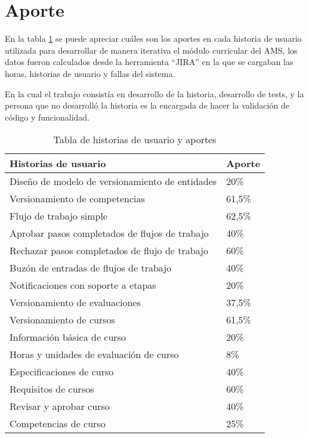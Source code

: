 \section{Aporte}
En la tabla \ref{mis-aportes} se puede apreciar cuáles son los aportes en cada historia de usuario utilizada para desarrollar de manera iterativa el módulo curricular del AMS, los datos fueron calculados desde la herramienta \enquote{JIRA} en la que se cargaban las horas, historias de usuario y fallas del sistema.

En la cual el trabajo consistía en desarrollo de la historia, desarrollo de tests, y la persona que no desarrolló la historia es la encargada de hacer la validación de código y funcionalidad.

\begin{table}[H]
\centering
\caption{Tabla de historias de usuario y aportes}
\label{mis-aportes}
\begin{tabular}{@{}ll@{}}
\toprule
Historias de usuario                                & Aporte \\ \midrule
Diseño de modelo de versionamiento de entidades     &  20\%  \\
Versionamiento de competencias                      & 61,5\% \\
Flujo de trabajo simple                             & 62,5\% \\
Aprobar pasos completados de flujos de trabajo      &  40\%  \\
Rechazar pasos completados de flujo de trabajo      &  60\%  \\
Buzón de entradas de flujos de trabajo              &  40\%  \\
Notificaciones con soporte a etapas                 &  20\%  \\
Versionamiento de evaluaciones                      & 37,5\% \\
Versionamiento de cursos                            & 61,5\% \\
Información básica de curso                         &  20\%  \\
Horas y unidades de evaluación de curso             &   8\%  \\
Especificaciones de curso                           &  40\%  \\
Requisitos de cursos                                &  60\%  \\
Revisar y aprobar curso                             &  40\%  \\
Competencias de curso                               &  25\%  \\

\end{tabular}
\end{table}
